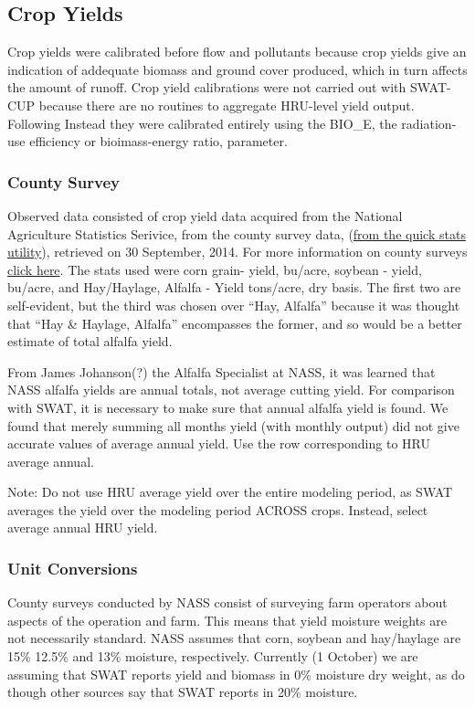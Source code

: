 \subsection{Crop Yields}

Crop yields were calibrated before flow and pollutants because crop yields give an indication of addequate biomass and ground cover produced, which in turn affects the amount of runoff. Crop yield calibrations were not carried out with SWAT-CUP because there are no routines to aggregate HRU-level yield output. Following  Instead they were calibrated entirely using the BIO\_E, the radiation-use efficiency or bioimass-energy ratio, parameter. 
	\subsubsection{County Survey}
	Observed data consisted of crop yield data acquired from the National Agriculture Statistics Serivice, from the county survey data, (\href{http://quickstats.nass.usda.gov/results/CD8890FD-566F-3F66-8C8A-CB932E358991}{from the quick stats utility}), retrieved on 30 September, 2014. For more information on county surveys \href{http://www.nass.usda.gov/Surveys/Guide_to_NASS_Surveys/County_Agricultural_Production/index.asp}{click here}. The stats used were corn grain- yield, bu/acre, soybean - yield, bu/acre, and Hay/Haylage, Alfalfa - Yield tons/acre, dry basis. The first two are self-evident, but the third was chosen over ``Hay, Alfalfa'' because it was thought that ``Hay \& Haylage, Alfalfa'' encompasses the former, and so would be a better estimate of total alfalfa yield.
	
	From James Johanson(?) the Alfalfa Specialist at NASS, it was learned that NASS alfalfa yields  are annual totals, not average cutting yield. For comparison with SWAT, it is necessary to make sure that annual alfalfa yield is found. We found that merely summing all months yield (with monthly output) did not give accurate values of average annual yield. Use the row corresponding to HRU average annual. 
	
	Note: Do not use HRU average yield over the entire modeling period, as SWAT averages the yield over the modeling period ACROSS crops. Instead, select average annual HRU yield. 

	\subsubsection{Unit Conversions}
	County surveys conducted by NASS consist of surveying farm operators about aspects of the operation and farm. This means that yield moisture weights are not necessarily standard. NASS assumes that corn, soybean and hay/haylage are 15\% 12.5\% and 13\% moisture, respectively. 
	Currently (1 October) we are assuming that SWAT reports yield and biomass in 0\% moisture dry weight, as do \citet{almendinger_contructingsunrise_2010} though other sources \citep{srinivasan_swatungauged_2010} say that SWAT reports in 20\% moisture. 

